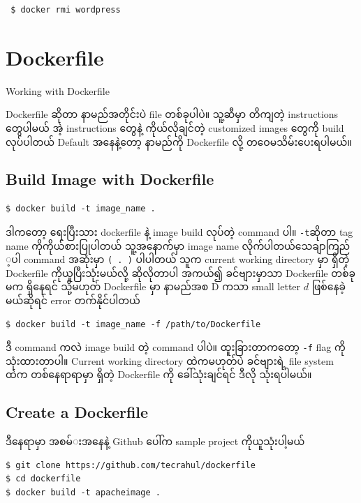 \documentclass{article}
\begin{document}
\begin{verbatim}
 $ docker rmi wordpress
\end{verbatim}

\section{Dockerfile}\label{dockerfile}

Working with Dockerfile

Dockerfile ဆိုတာ နာမည်​အတိုင်းပဲ file တစ်​ခုပါပဲ။ သူ့ဆီမှာ တိကျတဲ့
instructions ​တွေပါမယ်​ အဲ့ instructions ​တွေနဲ့ ကိုယ်​လိုချင်​တဲ့
customized images ​တွေကို​ build လုပ်​ပါတယ်​ Default အ​နေနဲ့​တော့
နာမည်​ကို Dockerfile လို့ တ​ဝေမသိမ်း​ပေးရပါမယ်​။

\subsection{Build Image with
Dockerfile}\label{build-image-with-dockerfile}

\begin{verbatim}
$ docker build -t image_name .
\end{verbatim}

ဒါက​တော့ ​ရေးပြီးသား dockerfile နဲ့ image build လုပ်​တဲ့ command ပါ။
\texttt{-t}ဆိုတာ tag name ကိုကိုယ်​စားပြုပါတယ်​ သူ့အ​နောက်​မှာ image
name လိုက်​ပါတယ်​ ​သေချာကြည်​့ပါ command အဆုံးမှာ \texttt{( . )}
ပါပါတယ်​ သူက current working directory မှာ ရှိတဲ့ Dockerfile
ကိုယူပြီးသုံးမယ်​လို့ ဆိုလိုတာပါ အကယ်​၍ ခင်​​ဗျားမှာသာ Dockerfile
တစ်​ခုမက ရှိ​နေရင်​ သို့မဟုတ်​ Dockerfile မှာ နာမည်​အစ D ကသာ small
letter $d$ ဖြစ်​​နေခဲ့မယ်​ဆိုရင်​ error တက်​နိုင်​ပါတယ်​

\begin{verbatim}
$ docker build -t image_name -f /path/to/Dockerfile
\end{verbatim}

ဒီ command ကလဲ image build တဲ့ command ပါပဲ။ ထူးခြားတာက​တော့ \texttt{-f}
flag ကိုသုံးထားတာပါ။ Current working directory ထဲကမဟုတ်​ပဲ ခင်​​ဗျားရဲ့
file system ထဲက တစ်​​နေရာရာမှာ ရှိတဲ့ Dockerfile ကို ​ခေါ်သုံးချင်​ရင်​
ဒီလို သုံးရပါမယ်​။

\subsection{Create a Dockerfile}\label{create-a-dockerfile}

ဒီ​နေရာမှာ အစမ်​း​အ​နေနဲ့ Github ​ပေါ်က sample project ကိုယူသုံးပါ့မယ်​

\begin{verbatim}
$ git clone https://github.com/tecrahul/dockerfile 
$ cd dockerfile
$ docker build -t apacheimage .
\end{verbatim}
\end{document}
